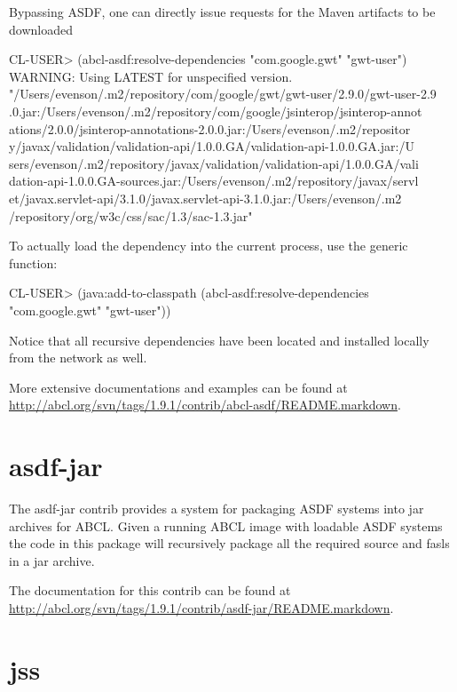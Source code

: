 \documentclass[10pt]{book}
\begin{document}
Bypassing \textsc{ASDF}, one can directly issue requests for the Maven
artifacts to be downloaded

\begin{listing-lisp}
CL-USER> (abcl-asdf:resolve-dependencies "com.google.gwt"
                                         "gwt-user")
WARNING: Using LATEST for unspecified version.
"/Users/evenson/.m2/repository/com/google/gwt/gwt-user/2.9.0/gwt-user-2.9
.0.jar:/Users/evenson/.m2/repository/com/google/jsinterop/jsinterop-annot
ations/2.0.0/jsinterop-annotations-2.0.0.jar:/Users/evenson/.m2/repositor
y/javax/validation/validation-api/1.0.0.GA/validation-api-1.0.0.GA.jar:/U
sers/evenson/.m2/repository/javax/validation/validation-api/1.0.0.GA/vali
dation-api-1.0.0.GA-sources.jar:/Users/evenson/.m2/repository/javax/servl
et/javax.servlet-api/3.1.0/javax.servlet-api-3.1.0.jar:/Users/evenson/.m2
/repository/org/w3c/css/sac/1.3/sac-1.3.jar"
\end{listing-lisp}

To actually load the dependency into the current process, use the
 generic function:

\begin{listing-lisp}
CL-USER> (java:add-to-classpath
          (abcl-asdf:resolve-dependencies "com.google.gwt"
                                          "gwt-user"))
\end{listing-lisp}

Notice that all recursive dependencies have been located and installed
locally from the network as well.

More extensive documentations and examples can be found at
\url{http://abcl.org/svn/tags/1.9.1/contrib/abcl-asdf/README.markdown}.

\section{asdf-jar}
\label{section:asdf-jar}

The asdf-jar contrib provides a system for packaging \textsc{ASDF}
systems into jar archives for \textsc{ABCL}.  Given a running
\textsc{ABCL} image with loadable \textsc{ASDF} systems the code in
this package will recursively package all the required source and
fasls in a jar archive.

The documentation for this contrib can be found at
\url{http://abcl.org/svn/tags/1.9.1/contrib/asdf-jar/README.markdown}.

\section{jss}
\label{section:jss}
\end{document}

